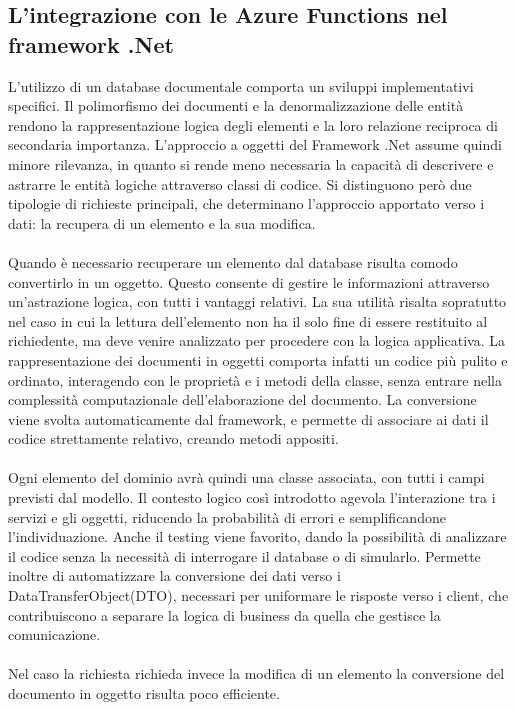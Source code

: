 \subsection{L'integrazione con le Azure Functions nel framework .Net}
L'utilizzo di un database documentale comporta un sviluppi implementativi specifici.
Il polimorfismo dei documenti e la denormalizzazione delle entità
rendono la rappresentazione logica degli elementi e la loro relazione reciproca di secondaria importanza.
L'approccio a oggetti del Framework .Net assume quindi minore rilevanza,
in quanto si rende meno necessaria la capacità di descrivere e astrarre
le entità logiche attraverso classi di codice.
Si distinguono però due tipologie di richieste principali,
che determinano l'approccio apportato verso i dati:
la recupera di un elemento e la sua modifica.\\
\\
Quando è necessario recuperare un elemento dal database risulta comodo
convertirlo in un oggetto.
Questo consente di gestire le informazioni attraverso un'astrazione logica, con tutti i vantaggi relativi.
La sua utilità risalta sopratutto nel caso in cui la lettura dell'elemento
non ha il solo fine di essere restituito al richiedente,
ma deve venire analizzato per procedere con la logica applicativa.
La rappresentazione dei documenti in oggetti comporta infatti un codice più pulito e ordinato,
interagendo con le proprietà e i metodi della classe, senza entrare nella complessità computazionale
dell'elaborazione del documento.
La conversione viene svolta automaticamente dal framework,
e permette di associare ai dati il codice strettamente relativo, creando metodi appositi.\\
\\
Ogni elemento del dominio avrà quindi una classe associata,
con tutti i campi previsti dal modello.
Il contesto logico così introdotto agevola l'interazione tra i servizi e gli oggetti,
riducendo la probabilità di errori e semplificandone l'individuazione.
Anche il testing viene favorito, dando la possibilità di analizzare il codice
senza la necessità di interrogare il database o di simularlo.
Permette inoltre di automatizzare la conversione dei dati verso i DataTransferObject(DTO),
necessari per uniformare le risposte verso i client,
che contribuiscono a separare la logica di business da quella che gestisce la comunicazione.\\
\\
Nel caso la richiesta richieda invece la modifica di un elemento
la conversione del documento in oggetto risulta poco efficiente.

